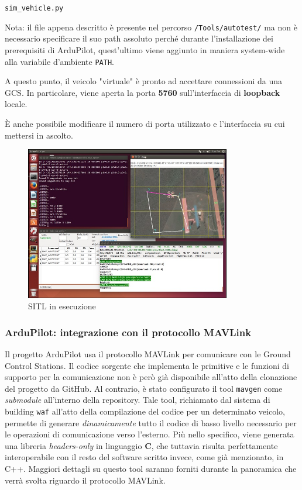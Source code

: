 \documentclass[a4paper, 12pt, oneside]{article}
\theoremstyle{definition}
\begin{document}
\begin{center}
    \texttt{sim\_vehicle.py}
\end{center}

Nota: il file appena descritto è presente nel percorso \texttt{/Tools/autotest/} ma non è necessario specificare il suo path assoluto perché durante l'installazione dei prerequisiti di ArduPilot, quest'ultimo viene aggiunto in maniera system-wide alla variabile d'ambiente \texttt{PATH}.

A questo punto, il veicolo "virtuale" è pronto ad accettare connessioni da una GCS. In particolare, viene aperta la porta \textbf{5760} sull'interfaccia di \textbf{loopback} locale.

È anche possibile modificare il numero di porta utilizzato e l'interfaccia su cui mettersi in ascolto.

\begin{figure}[H]
    \centering
    \includegraphics[width=0.8\textwidth]{images/sitl.jpg}
    \caption{SITL in esecuzione}
\end{figure}



\subsubsection{ArduPilot: integrazione con il protocollo MAVLink}
Il progetto ArduPilot usa il protocollo MAVLink per comunicare con le Ground Control Stations. Il codice sorgente che implementa le primitive e le funzioni di supporto per la comunicazione non è però già disponibile all'atto della clonazione del progetto da GitHub. Al contrario, è stato configurato il tool \texttt{mavgen} come \textit{submodule} all'interno della repository. Tale tool, richiamato dal sistema di building \texttt{waf} all'atto della compilazione del codice per un determinato veicolo, permette di generare \textit{dinamicamente} tutto il codice di basso livello necessario per le operazioni di comunicazione verso l'esterno\cite{mavgen}. Più nello specifico, viene generata una libreria \textit{headers-only} in linguaggio \textbf{C}, che tuttavia risulta perfettamente interoperabile con il resto del software scritto invece, come già menzionato, in C++. Maggiori dettagli su questo tool saranno forniti durante la panoramica che verrà svolta riguardo il protocollo MAVLink.
\end{document}

